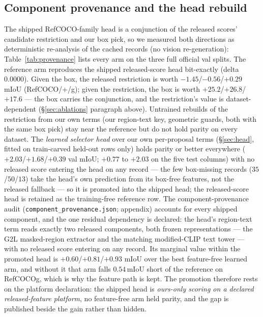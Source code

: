 \subsection{Component provenance and the head rebuild}
\label{sec:provenance}
The shipped RefCOCO-family head is a conjunction of the released scores'
candidate restriction and our box pick, so we measured both directions as
deterministic re-analysis of the cached records (no vision re-generation):
Table~\ref{tab:provenance} lists every arm on the three full official val
splits. The reference arm reproduces the shipped released-score head
bit-exactly (delta $0.0000$). Given the box, the released restriction is worth
$-1.45$/$-0.56$/$+0.29$ mIoU (RefCOCO/+/g); given the restriction, the box is
worth $+25.2$/$+26.8$/$+17.6$ --- the box carries the conjunction, and the
restriction's value is dataset-dependent (\S\ref{sec:ablations} paragraph
above). Untrained rebuilds of the restriction from our own terms (our
region-text key, geometric guards, both with the same box pick) stay near the
reference but do not hold parity on every dataset. The \emph{learned selector
head} over our own per-proposal terms (\S\ref{sec:head}, fitted on
train-carved held-out rows only) holds parity or better everywhere
($+2.03$/$+1.68$/$+0.39$ val mIoU; $+0.77$ to $+2.03$ on the five test
columns) with no released score entering the head on any record --- the few
box-missing records ($35$/$50$/$13$) take the head's own prediction from its
box-free features, not the released fallback --- so it is promoted into the
shipped head; the released-score head is retained as the training-free
reference row. The component-provenance audit
(\texttt{component\_provenance.json}; appendix) accounts for every shipped
component, and the one residual dependency is declared: the head's region-text
term reads exactly two released components, both frozen representations ---
the G2L masked-region extractor and the matching modified-CLIP text tower ---
with no released score entering on any record. Its marginal value within the
promoted head is
$+0.60$/$+0.81$/$+0.93$ mIoU over the best feature-free learned arm, and
without it that arm falls $0.54$\,mIoU short of the reference on RefCOCOg,
which is why the feature path is kept. The promotion therefore rests on the
platform declaration: the shipped head is \emph{ours-only scoring on a declared
released-feature platform}, no feature-free arm held parity, and the gap is
published beside the gain rather than hidden.

\begin{table}[t]\centering\small
\caption{Head rebuild on the three full official val splits (deterministic
re-analysis of the cached records; the reference arm reproduces the shipped
released-score head bit-exactly). Drop-one deltas below the rule: given the
box, the released restriction; given the restriction, the box.}
\label{tab:provenance}

\end{table}


